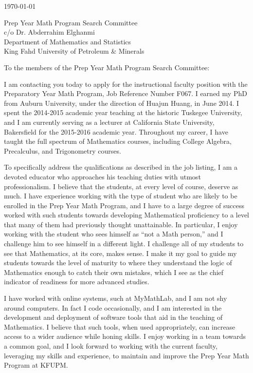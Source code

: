 \documentclass[11pt]{article}
\begin{document}
\makeletterhead

\vfill

\today

\vfill

Prep Year Math Program Search Committee\\
c/o Dr. Abderrahim Elghanmi\\
Department of Mathematics and Statistics\\
King Fahd University of Petroleum \& Minerals

\vfill

To the members of the Prep Year Math Program Search Committee:

\vfill

I am contacting you today to apply for the instructional faculty
position with the Preparatory Year Math Program, Job Reference Number
F067.
I earned my PhD from Auburn University, under the direction of Huajun
Huang, in June 2014.
I spent the 2014-2015 academic year teaching at the historic Tuskegee
University, and I am currently serving as a lecturer at California
State University, Bakersfield for the 2015-2016 academic year.
Throughout my career, I have taught the full spectrum of Mathematics
courses, including College Algebra, Precalculus, and Trigonometry
courses.

To specifically address the qualifications as described in the job
listing, I am a devoted educator who approaches his teaching duties
with utmost professionalism.
I believe that the students, at every level of course, deserve as much.
I have experience working with the type of student who are likely to
be enrolled in the Prep Year Math Program, and I have to a large degree
of success worked with such students towards developing Mathematical
proficiency to a level that many of them had previously thought
unattainable.
In particular, I enjoy working with the student who sees himself as
``not a Math person,'' and I challenge him to see himself in a
different light.
I challenge all of my students to see that Mathematics, at its core,
makes sense.
I make it my goal to guide my students towards the level of maturity
to where they understand the logic of Mathematics enough to catch their
own mistakes, which I see as the chief indicator of readiness for more
advanced studies.

I have worked with online systems, such at MyMathLab, and I am not shy
around computers.
In fact I code occasionally, and I am interested in
the development and deployment of software tools that aid in the
teaching of Mathematics.
I believe that such tools, when used
appropriately, can increase access to a wider audience while honing
skills.
I enjoy working in a team towards a common goal, and I look
forward to working with the current faculty, leveraging my skills and
experience, to maintain and improve the Prep Year Math Program at KFUPM.
\end{document}
